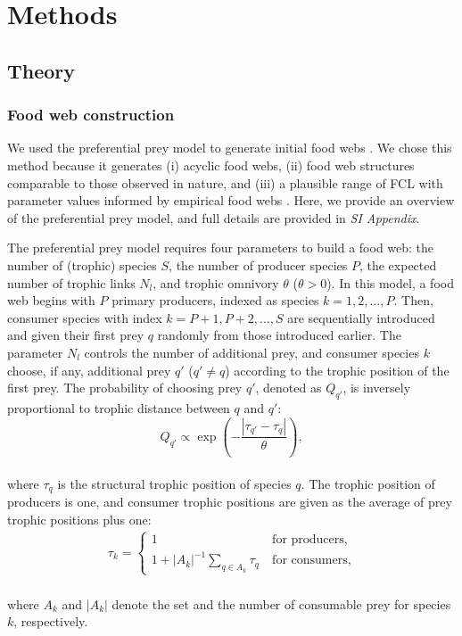 \documentclass[9pt,twocolumn,twoside]{pnas-new}
\begin{document}
\section{Methods}

\subsection{Theory}

\subsubsection*{Food web construction}

We used the preferential prey model to generate initial food webs \citep{johnson_trophic_2014}.
We chose this method because it generates (i) acyclic food webs, (ii) food web structures comparable to those observed in nature, and (iii) a plausible range of FCL with parameter values informed by empirical food webs \citep{shibasaki_food_2024}.
Here, we provide an overview of the preferential prey model, and full details are provided in \textit{SI Appendix}.

The preferential prey model requires four parameters to build a food web: the number of (trophic) species $S$, the number of producer species $P$, the expected number of trophic links $N_l$, and trophic omnivory $\theta$ ($\theta > 0$).
In this model, a food web begins with $P$ primary producers, indexed as species $k = 1, 2, ..., P$.
Then, consumer species with index $k = P + 1, P + 2, ..., S$ are sequentially introduced and given their first prey $q$ randomly from those introduced earlier.
The parameter $N_l$ controls the number of additional prey, and consumer species $k$ choose, if any, additional prey $q'$ ($q' \ne q$) according to the trophic position of the first prey.
The probability of choosing prey $q'$, denoted as $Q_{q'}$, is inversely proportional to trophic distance between $q$ and $q'$:
\\
\begin{equation}
    Q_{q'} 
    \propto 
    \exp
    \left(
    -\frac{|\tau_{q'} - \tau_q|}{\theta}
    \right),
\end{equation}
\\
where $\tau_q$ is the structural trophic position of species $q$.
The trophic position of producers is one, and
consumer trophic positions are given as the average of prey trophic positions plus one:
\\
\begin{align}
    \tau_k = 
    \begin{cases}
    1 & ~\text{for producers},\\
    1 + |A_{k}|^{-1} \sum_{q \in A_{k}} \tau_q & ~\text{for consumers},
    \end{cases}
\end{align}
\\
where $A_{k}$ and $|A_{k}|$ denote the set and the number of consumable prey for species $k$, respectively.
\end{document}
